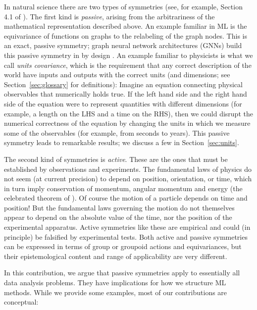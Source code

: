\documentclass[preprint]{article} %
\newcommand{\sectionname}{Section}
\newcommand{\secref}[1]{\sectionname~\ref{#1}}
\begin{document}
In natural science there are two types of symmetries (see, for example, Section 4.1 of \citealt{rovelli2000loop}). 
The first kind is \emph{passive}, arising from the arbitrariness of the mathematical representation described above.
An example familiar in ML is the equivariance of functions on graphs to the relabeling of the graph nodes.
This is an exact, passive symmetry; graph neural network architectures (GNNs) build this passive symmetry in by design \citep{bruna2013spectral, duvenaud2015convolutional, gilmer2017neural}. 
An example familiar to physicists is what we call \emph{units covariance}, which is the requirement that any correct description of the world have inputs and outputs with the correct units (and dimensions; see \secref{sec:glossary} for definitions):
Imagine an equation connecting physical observables that numerically holds true.
If the left hand side and the right hand side of the equation were to represent quantities with different dimensions (for example, a length on the LHS and a time on the RHS), then we could disrupt the numerical correctness of the equation by changing the units in which we measure some of the observables (for example, from seconds to years).
This passive symmetry leads to remarkable results; we discuss a few in \secref{sec:units}.

The second kind of symmetries is \emph{active}.
These are the ones that must be established by observations and experiments.
The fundamental laws of physics do not seem (at current precision) to depend on position, orientation, or time, which in turn imply conservation of momentum, angular momentum and energy (the celebrated theorem of \citealt{noether}).
Of course the motion of a particle depends on time and position! But the fundamental laws governing the motion do not themselves appear to depend on the absolute value of the time, nor the position of the experimental apparatus.
Active symmetries like these are empirical and could (in principle) be falsified by experimental tests.
Both active and passive symmetries can be expressed in terms of group or groupoid actions and equivariances, but their epistemological content and range of applicability are very different. 

In this contribution, we argue that passive symmetries apply to essentially all data analysis problems.
They have implications for how we structure ML methods. While we provide some examples, most of our contributions are conceptual:
\end{document}
